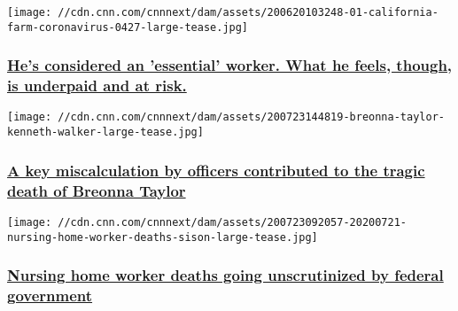 \href{/2020/06/26/us/farmworker-coronavirus-invs/index.html}{}

\texttt{[image: //cdn.cnn.com/cnnnext/dam/assets/200620103248-01-california-farm-coronavirus-0427-large-tease.jpg]}

\hypertarget{hes-considered-an-essential-worker-what-he-feels-though-is-underpaid-and-at-risk}{%
\subsubsection{\texorpdfstring{\href{/2020/06/26/us/farmworker-coronavirus-invs/index.html}{He's
considered an 'essential' worker. What he feels, though, is underpaid
and at
risk.}}{He's considered an 'essential' worker. What he feels, though, is underpaid and at risk.}}\label{hes-considered-an-essential-worker-what-he-feels-though-is-underpaid-and-at-risk}}

\href{/2020/07/23/us/breonna-taylor-police-shooting-invs/index.html}{}

\texttt{[image: //cdn.cnn.com/cnnnext/dam/assets/200723144819-breonna-taylor-kenneth-walker-large-tease.jpg]}

\hypertarget{a-key-miscalculation-by-officers-contributed-to-the-tragic-death-of-breonna-taylor-1}{%
\subsubsection{\texorpdfstring{\href{/2020/07/23/us/breonna-taylor-police-shooting-invs/index.html}{A
key miscalculation by officers contributed to the tragic death of
Breonna
Taylor}}{A key miscalculation by officers contributed to the tragic death of Breonna Taylor}}\label{a-key-miscalculation-by-officers-contributed-to-the-tragic-death-of-breonna-taylor-1}}

\href{/2020/07/23/us/nursing-home-worker-death-investigations-osha-invs/index.html}{}

\texttt{[image: //cdn.cnn.com/cnnnext/dam/assets/200723092057-20200721-nursing-home-worker-deaths-sison-large-tease.jpg]}

\hypertarget{nursing-home-worker-deaths-going-unscrutinized-by-federal-government--1}{%
\subsubsection{\texorpdfstring{\href{/2020/07/23/us/nursing-home-worker-death-investigations-osha-invs/index.html}{Nursing
home worker deaths going unscrutinized by federal government
}}{Nursing home worker deaths going unscrutinized by federal government }}\label{nursing-home-worker-deaths-going-unscrutinized-by-federal-government--1}}

